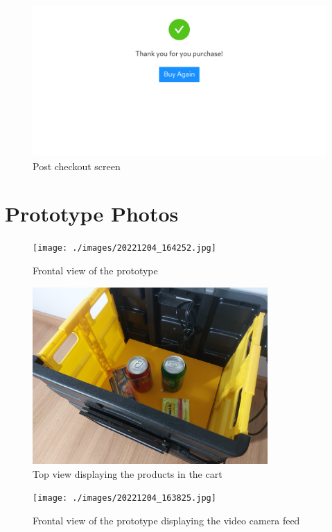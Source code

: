 \documentclass[openright]{normas-utf-tex} %
\begin{document}
\begin{figure}[H]
	\centering
	\includegraphics[width=1\textwidth]{./images/userapp5.png}
	\caption[]{Post checkout screen}
\end{figure}

\apendice
\chapter{Prototype Photos}
\label{app:photos}

\begin{figure}[H]
	\centering
	\texttt{[image: ./images/20221204\_164252.jpg]}
	\caption[]{Frontal view of the prototype}
\end{figure}

\begin{figure}[H]
	\centering
    \includegraphics[width=0.8\textwidth]{./images/20221204_164147.jpg}
	\caption[]{Top view displaying the products in the cart}
\end{figure}

\begin{figure}[H]
	\centering
    \texttt{[image: ./images/20221204\_163825.jpg]}
	\caption[]{Frontal view of the prototype displaying the video camera feed}
\end{figure}
\end{document}
